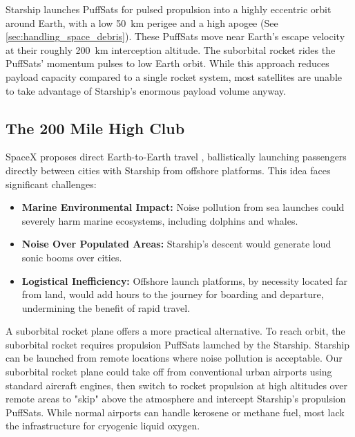 \documentclass{article}
\begin{document}
{Starship launches PuffSats for pulsed propulsion into a highly eccentric orbit around Earth, with a low \SI{50}{\kilo\meter} perigee and a high apogee (See \autoref{sec:handling_space_debris}). These PuffSats move near Earth’s escape velocity at their roughly \SI{200}{\kilo\meter} interception altitude. The suborbital rocket rides the PuffSats'  momentum pulses to low Earth orbit. While this approach reduces payload capacity compared to a single rocket system, most satellites are unable to take advantage of Starship’s enormous payload volume anyway.

\subsection{The 200 Mile High Club} \label{sec:200_mile_high}
SpaceX proposes direct Earth-to-Earth travel \cite{earth_to_earth}, ballistically launching passengers directly between cities with Starship from offshore platforms. This idea faces significant challenges:
\begin{itemize}
\item \textbf{Marine Environmental Impact:} Noise pollution from sea launches could severely harm marine ecosystems, including dolphins and whales.
\item \textbf{Noise Over Populated Areas:} Starship's descent would generate loud sonic booms over cities.
\item \textbf{Logistical Inefficiency:} Offshore launch platforms, by necessity located far from land, would add hours to the journey for boarding and departure, undermining the benefit of rapid travel.
\end{itemize}
A suborbital rocket plane offers a more practical alternative. To reach orbit, the suborbital rocket requires propulsion PuffSats launched by the Starship.   Starship can be launched from remote locations where noise pollution is acceptable.  Our suborbital rocket plane could take off from conventional urban airports using standard aircraft engines, then switch to rocket propulsion at high altitudes over remote areas to "skip" above the atmosphere and intercept Starship's propulsion PuffSats.   While normal airports can handle kerosene or methane fuel, most lack the infrastructure for cryogenic liquid oxygen.

}
\end{document}
